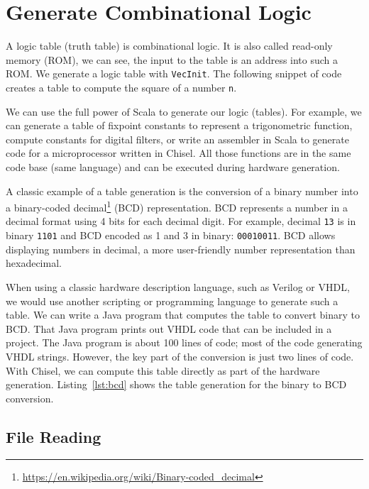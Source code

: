 \documentclass[%
    10pt,
    headinclude, footinclude=false,
    openright, %
    notitlepage,
    cleardoublepage=empty,
    headsepline,
    numbers=noenddot,
    bibliography=totoc, index=totoc,
    ]{scrbook}
\newcommand{\code}[1]{{\lstinline[basicstyle=\small\ttfamily]{#1}}}
\newcommand{\myref}[2]{\href{#1}{#2}}
\renewcommand{\myref}[2]{{#2}{\footnote{\url{#1}}}}
\begin{document}
\section{Generate Combinational Logic}
\label{sec:gen:comb:logic}

A logic table (truth table) is combinational logic. It is also called read-only memory (ROM),
we can see, the input to the table is an address into such a ROM.
We generate a logic table with \code{VecInit}.  The following snippet of code creates
a table to compute the square of a number \code{n}.


We can use the full power of Scala to generate our logic (tables).
For example, we can generate a table of fixpoint constants to represent a trigonometric function,
compute constants for digital filters, or write an assembler in Scala
to generate code for a microprocessor written in Chisel. All those functions
are in the same code base (same language) and can be executed during
hardware generation.

A classic example of a table generation is the conversion of a binary number
into a \myref{https://en.wikipedia.org/wiki/Binary-coded_decimal}{binary-coded decimal}
(BCD) representation. BCD represents a number in a decimal
format using 4 bits for each decimal digit. For example, decimal \code{13} is in binary
\code{1101} and BCD encoded as 1 and 3 in binary: \code{00010011}.
BCD allows displaying numbers in decimal, a more user-friendly number
representation than hexadecimal.

When using a classic hardware description language, such as Verilog or VHDL,
we would use another scripting or programming language to generate such a table.
We can write a Java program that computes the table to convert binary to BCD.
That Java program prints out VHDL code that can be included in a project.
The Java program is about 100 lines of code; most of the code generating
VHDL strings. However, the key part of the conversion is just two lines of code.
With Chisel, we can compute this table directly as part of the hardware generation.
Listing~\ref{lst:bcd} shows the table generation for the binary to BCD conversion.


\subsection{File Reading}
\end{document}
